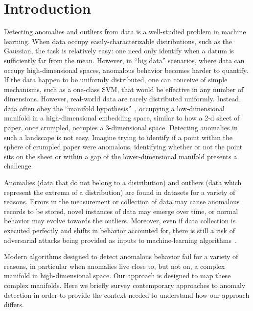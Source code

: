 \section{Introduction}
\label{sec:introduction}

Detecting anomalies and outliers from data is a well-studied problem in machine learning.
When data occupy easily-characterizable distributions, such as the Gaussian, the task is relatively easy: one need only identify when a datum is sufficiently far from the mean.
However, in ``big data'' scenarios, where data can occupy high-dimensional spaces, anomalous behavior becomes harder to quantify.
If the data happen to be uniformly distributed, one can conceive of simple mechanisms, such as a one-class SVM, that would be effective in any number of dimensions.
However, real-world data are rarely distributed uniformly.
Instead, data often obey the ``manifold hypothesis''~\cite{fefferman2016testing}, occupying a low-dimensional manifold in a high-dimensional embedding space, similar to how a 2-d sheet of paper, once crumpled, occupies a 3-dimensional space.
Detecting anomalies in such a landscape is not easy.
Imagine trying to identify if a point within the sphere of crumpled paper were anomalous, identifying whether or not the point sits on the sheet or within a gap of the lower-dimensional manifold presents a challenge.

Anomalies (data that do not belong to a distribution) and outliers (data which represent the extrema of a distribution) are found in datasets for a variety of reasons.
Errors in the measurement or collection of data may cause anomalous records to be stored,
novel instances of data may emerge over time,
or normal behavior may evolve towards the outliers.
Moreover, even if data collection is executed perfectly and shifts in behavior accounted for, there is still a risk of adversarial attacks being provided as inputs to machine-learning algorithms~\cite{elsayed2018adversarial}.


Modern algorithms designed to detect anomalous behavior fail for a variety of reasons, in particular when anomalies live close to, but not on, a complex manifold in high-dimensional space.
Our approach is designed to map these complex manifolds.
Here we briefly survey contemporary approaches to anomaly detection in order to provide the context needed to understand how our approach differs.


